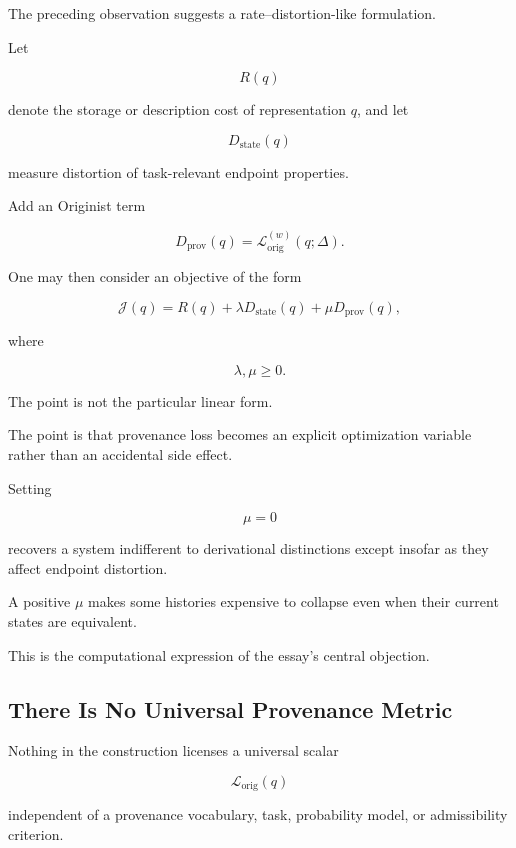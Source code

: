 \documentclass[
  11pt,
  a4paper,
  DIV=12,
  BCOR=0mm,
  parskip=half-
]{scrartcl}
\newcommand{\lossorig}{%
  \mathscr L_{\mathrm{orig}}%
}
\theoremstyle{definition}
\theoremstyle{plain}
\theoremstyle{remark}
\begin{document}
The preceding observation suggests a rate--distortion-like formulation.

Let

\[
  R(q)
\]

denote the storage or description cost of representation \(q\), and let

\[
  D_{\mathrm{state}}(q)
\]

measure distortion of task-relevant endpoint properties.

Add an Originist term

\[
  D_{\mathrm{prov}}(q)
  =
  \lossorig^{(w)}(q;\Delta).
\]

One may then consider an objective of the form

\[
  \mathcal J(q)
  =
  R(q)
  +
  \lambda
  D_{\mathrm{state}}(q)
  +
  \mu
  D_{\mathrm{prov}}(q),
\]

where

\[
  \lambda,\mu\geq 0.
\]

The point is not the particular linear form.

The point is that provenance loss becomes an explicit optimization variable
rather than an accidental side effect.

Setting

\[
  \mu=0
\]

recovers a system indifferent to derivational distinctions except insofar as
they affect endpoint distortion.

A positive \(\mu\) makes some histories expensive to collapse even when their
current states are equivalent.

This is the computational expression of the essay's central objection.


\subsection{There Is No Universal Provenance Metric}
\label{app:no-universal-provenance-metric}

Nothing in the construction licenses a universal scalar

\[
  \lossorig(q)
\]

independent of a provenance vocabulary, task, probability model, or
admissibility criterion.
\end{document}
